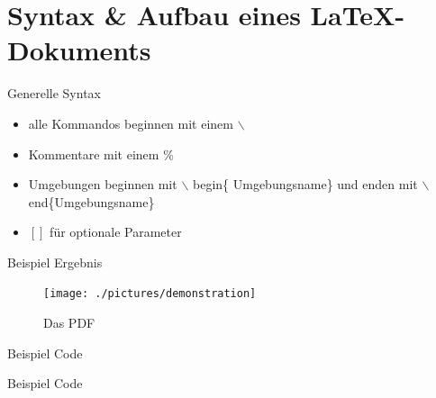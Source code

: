 \section{Syntax \& Aufbau eines \LaTeX -Dokuments}
%
\begin{frame}{Generelle Syntax}
	\begin{itemize}
		\item alle Kommandos beginnen mit einem $\backslash$
		\item Kommentare mit einem \%
		\item Umgebungen beginnen mit $\backslash$ begin\{ Umgebungsname\} und enden mit $\backslash$ end\{Umgebungsname\}
		\item $\left[ \right]$ für optionale Parameter
	\end{itemize}
\end{frame}

\begin{frame}[fragile]{Beispiel Ergebnis}
	\begin{figure}[tbph]
	\centering
	\texttt{[image: ./pictures/demonstration]}
	\caption{Das PDF}
	\label{fig:demonstration}
	\end{figure}
\end{frame}

\begin{frame}[fragile]{Beispiel Code}
	\begin{Code}
	\centering
		\begin{minipage}{0.9\textwidth}
	
		
	
		\end{minipage}
	\end{Code}

\end{frame}
\begin{frame}[fragile]{Beispiel Code}
	\lstsettex
	\begin{Code}
	\centering
		\begin{minipage}{0.9\textwidth}
		
		\end{minipage}
	\end{Code}

\end{frame}



